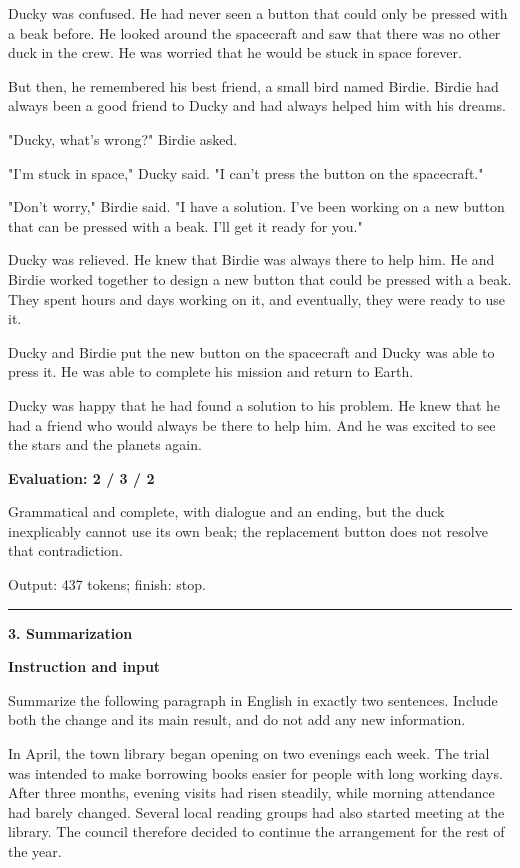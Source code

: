 \documentclass[10pt]{article}
\begin{document}
{\begin{minipage}{\textwidth}
Ducky was confused. He had never seen a button that could only be pressed with a beak before. He looked around the spacecraft and saw that there was no other duck in the crew. He was worried that he would be stuck in space forever.
\par\smallskip
But then, he remembered his best friend, a small bird named Birdie. Birdie had always been a good friend to Ducky and had always helped him with his dreams.
\par\smallskip
"Ducky, what's wrong?" Birdie asked.
\par\smallskip
"I'm stuck in space," Ducky said. "I can't press the button on the spacecraft."
\par\smallskip
"Don't worry," Birdie said. "I have a solution. I've been working on a new button that can be pressed with a beak. I'll get it ready for you."
\par\smallskip
Ducky was relieved. He knew that Birdie was always there to help him. He and Birdie worked together to design a new button that could be pressed with a beak. They spent hours and days working on it, and eventually, they were ready to use it.
\par\smallskip
Ducky and Birdie put the new button on the spacecraft and Ducky was able to press it. He was able to complete his mission and return to Earth.
\par\smallskip
Ducky was happy that he had found a solution to his problem. He knew that he had a friend who would always be there to help him. And he was excited to see the stars and the planets again.\par\smallskip
\textbf{Evaluation: 2 / 3 / 2}\par Grammatical and complete, with dialogue and an ending, but the duck inexplicably cannot use its own beak; the replacement button does not resolve that contradiction.
\par {\color{gray} Output: 437 tokens; finish: stop.}\par
\medskip\hrule\smallskip
{\bfseries 3. Summarization}\par\smallskip
\textbf{Instruction and input}\par Summarize the following paragraph in English in exactly two sentences. Include both the change and its main result, and do not add any new information.
\par\smallskip
In April, the town library began opening on two evenings each week. The trial was intended to make borrowing books easier for people with long working days. After three months, evening visits had risen steadily, while morning attendance had barely changed. Several local reading groups had also started meeting at the library. The council therefore decided to continue the arrangement for the rest of the year.\par\smallskip

\end{minipage}}
\end{document}
